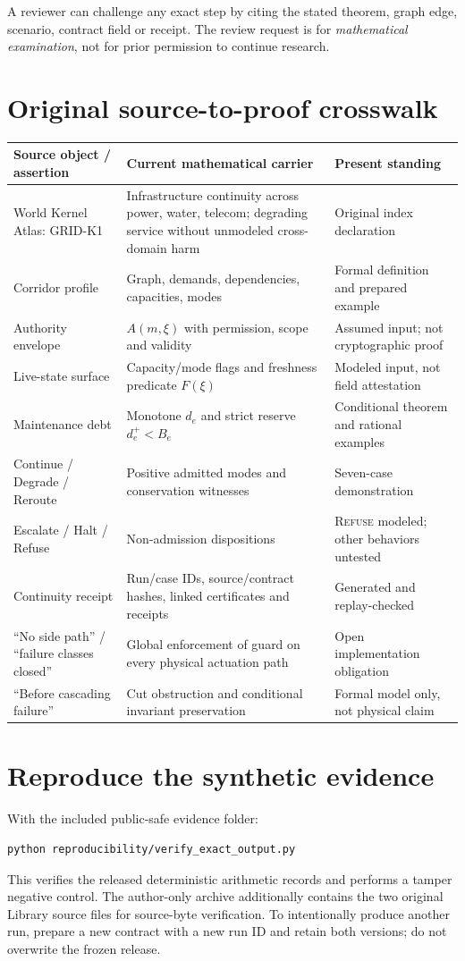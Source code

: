 \documentclass[11pt,letterpaper]{article}
\theoremstyle{definition}\newtheorem{definition}[theorem]{Definition}\newtheorem{example}[theorem]{Example}
\theoremstyle{remark}\newtheorem{remark}[theorem]{Remark}
\begin{document}
A reviewer can challenge any exact step by citing the stated theorem, graph edge, scenario, contract field or receipt. The review request is for \emph{mathematical examination}, not for prior permission to continue research.

\appendix
\section{Original source-to-proof crosswalk}
\small
\begin{longtable}{@{}p{.24\linewidth}p{.37\linewidth}p{.27\linewidth}@{}}\toprule
Source object / assertion & Current mathematical carrier & Present standing\\\midrule\endhead
World Kernel Atlas: GRID-K1 & Infrastructure continuity across power, water, telecom; degrading service without unmodeled cross-domain harm & Original index declaration\\
Corridor profile & Graph, demands, dependencies, capacities, modes & Formal definition and prepared example\\
Authority envelope & $A(m,\xi)$ with permission, scope and validity & Assumed input; not cryptographic proof\\
Live-state surface & Capacity/mode flags and freshness predicate $F(\xi)$ & Modeled input, not field attestation\\
Maintenance debt & Monotone $d_e$ and strict reserve $d_e^+<B_e$ & Conditional theorem and rational examples\\
Continue / Degrade / Reroute & Positive admitted modes and conservation witnesses & Seven-case demonstration\\
Escalate / Halt / Refuse & Non-admission dispositions & \textsc{Refuse} modeled; other behaviors untested\\
Continuity receipt & Run/case IDs, source/contract hashes, linked certificates and receipts & Generated and replay-checked\\
``No side path'' / ``failure classes closed'' & Global enforcement of guard on every physical actuation path & Open implementation obligation\\
``Before cascading failure'' & Cut obstruction and conditional invariant preservation & Formal model only, not physical claim\\\bottomrule
\end{longtable}
\normalsize
\section{Reproduce the synthetic evidence}
With the included public-safe evidence folder:
\begin{verbatim}
python reproducibility/verify_exact_output.py
\end{verbatim}
This verifies the released deterministic arithmetic records and performs a tamper negative control. The author-only archive additionally contains the two original Library source files for source-byte verification. To intentionally produce another run, prepare a new contract with a new run ID and retain both versions; do not overwrite the frozen release.
\end{document}
